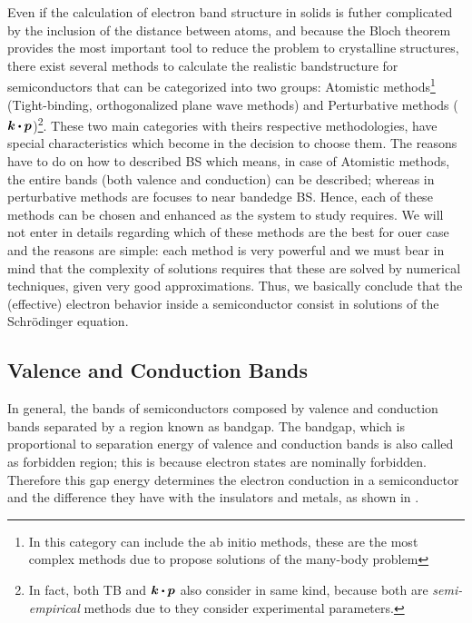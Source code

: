 Even if the calculation of electron band structure in solids is futher complicated by the inclusion of the distance between atoms, and because the Bloch theorem provides the most important tool to reduce the problem to crystalline structures, there exist several methods to calculate the realistic bandstructure for semiconductors that can be categorized into two groups: Atomistic methods\footnote{In this category can include the ab initio methods, these are the most complex methods due to propose  solutions of the many-body problem} (Tight-binding, orthogonalized plane wave methods) and Perturbative methods ($\boldsymbol{k}\bigcdot \boldsymbol{p}$)\footnote{In fact, both TB and $\boldsymbol{k}\bigcdot \boldsymbol{p}$ also consider in same kind, because both are \emph{semi-empirical} methods due to they consider experimental parameters.}. 
These two main categories with theirs respective methodologies, have special characteristics which become in the decision to choose them. The reasons have to do on how to  described \gls{BS} which means, in case of Atomistic methods, the entire bands  (both valence and conduction) can be described; whereas in perturbative methods are focuses to near bandedge \gls{BS}. Hence, each of these methods can be chosen and enhanced as the system to study requires. 
We will not enter in details regarding  which of these methods are the best for ouer case and the reasons are simple: each method is very powerful and we must bear in mind that the complexity of solutions requires that these are solved by numerical techniques, given very good approximations. 
Thus, we basically conclude that the (effective) electron behavior inside a semiconductor consist in solutions of the Schrödinger equation\cite{boer2018semiconductor}.  
\subsection{Valence and Conduction Bands}
\label{subsec:chapter-1-valence-and-conduction-bands}
\vspace{-10mm}
In general,  the bands of semiconductors composed by valence and conduction bands separated by a  region known as bandgap. 
The bandgap, which is proportional to separation energy of valence and conduction bands is also called as forbidden region; this is because electron states are nominally forbidden. Therefore this gap energy determines the electron conduction in a semiconductor and the difference they have with the insulators and metals, as shown in .  

